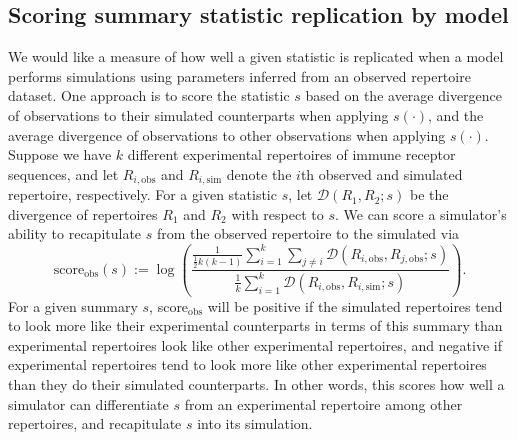 \documentclass{article}
\begin{document}
\subsection*{Scoring summary statistic replication by model}
We would like a measure of how well a given statistic is replicated when a model performs simulations using parameters inferred from an observed repertoire dataset.
One approach is to score the statistic $s$ based on the average divergence of observations to their simulated counterparts when applying $s(\cdot)$, and the average divergence of observations to other observations when applying $s(\cdot)$.
Suppose we have $k$ different experimental repertoires of immune receptor sequences, and let $R_{i, \text{obs}}$ and $R_{i, \text{sim}}$ denote the $i$th observed and simulated repertoire, respectively.
For a given statistic $s$, let $\mathcal D(R_1, R_2; s)$ be the divergence of repertoires $R_1$ and $R_2$ with respect to $s$.
We can score a simulator's ability to recapitulate $s$ from the observed repertoire to the simulated via
\begin{equation}
    \text{score}_\text{obs}(s) :=
    \log \left(
        \frac{
            \frac{1}{\frac{1}{2} k\left(k - 1\right)}
            \sum_{i=1}^{k}
            \sum_{j \ne i}
                \mathcal D\left(R_{i, \text{obs}}, R_{j, \text{obs}}; s\right)
        }
        {
            \frac{1}{k}
            \sum_{i = 1}^k
                \mathcal D \left( R_{i, \text{obs}}, R_{i, \text{sim}} ; s\right)
        }
    \right).
\end{equation}
For a given summary $s$, score$_\text{obs}$ will be positive if the simulated repertoires tend to look more like their experimental counterparts in terms of this summary than experimental repertoires look like other experimental repertoires, and negative if experimental repertoires tend to look more like other experimental repertoires than they do their simulated counterparts.
In other words, this scores how well a simulator can differentiate $s$ from an experimental repertoire among other repertoires, and recapitulate $s$ into its simulation.
\end{document}
